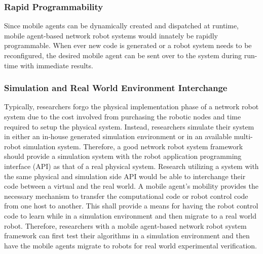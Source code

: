       \subsubsection{Rapid Programmability}

        Since mobile agents can be dynamically created and dispatched at runtime,
          mobile agent-based network robot systems would innately be rapidly
          programmable.
        When ever new code is generated or a robot system needs to be reconfigured,
          the desired mobile agent can be sent over to the system during
          run-time with immediate results.

      \subsubsection{Simulation and Real World Environment Interchange}

         Typically, researchers forgo the physical implementation phase of a
          network robot system due to the cost involved from purchasing the
          robotic nodes and time required to setup the physical system.
        Instead, researchers simulate their system in either an in-house generated
          simulation environment or in an available multi-robot simulation
          system.
        Therefore, a good network robot system framework should provide a
          simulation system with the robot application programming interface (API)
          as that of a real physical system.
        Research utilizing a system with the same physical and simulation side
          API would be able to interchange their code between a virtual
          and the real world.
        A mobile agent's mobility provides the necessary mechanism to transfer 
          the computational code or robot control code from one host to another.
        This shall provide a means for having the robot control code to learn
          while in a simulation environment and then migrate to a
          real world robot.
        Therefore, researchers with a mobile agent-based network robot system 
          framework can first test their algorithms in a simulation environment 
          and then have the mobile agents migrate to robots for real world 
          experimental verification.
